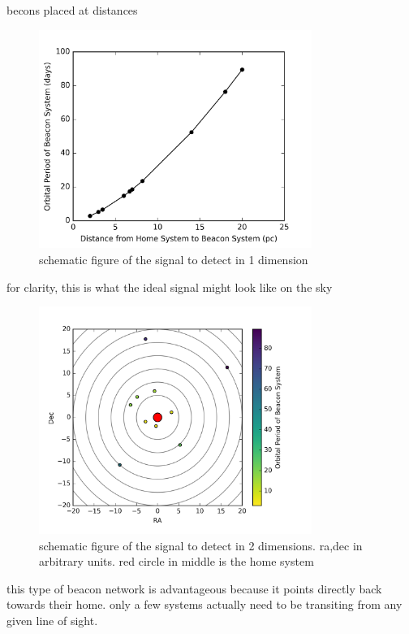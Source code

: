 \documentclass[manuscript, letterpaper]{aastex6}
\begin{document}
becons placed at distances


\begin{figure}[]
\centering
\includegraphics[width=3.5in]{../figures/dist_per.png}
\caption{schematic figure of the signal to detect in 1 dimension}
\label{fig:1d}
\end{figure}


for clarity, this is what the ideal signal might look like on the sky

\begin{figure}[]
\centering
\includegraphics[width=3.5in]{../figures/sky_per.png}
\caption{schematic figure of the signal to detect in 2 dimensions. ra,dec in arbitrary units. red circle in middle is the home system}
\label{fig:2d}
\end{figure}





this type of beacon network is advantageous because it points directly back towards their home. only a few systems actually need to be transiting from any given line of sight.
\end{document}

